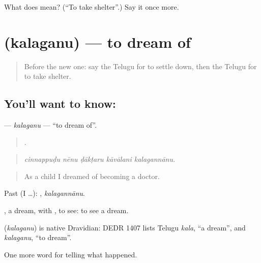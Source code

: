 \begin{tcolorbox}[breakable,colback=teal!4,colframe=teal!35!black,title={Before you move on}]
What does  mean? (\textquotedblleft{}To take shelter\textquotedblright{}.) Say it once more.
\end{tcolorbox}
\section[\texorpdfstring{\te{కలగను} (kalaganu)}{కలగను (kalaganu)}]{ (kalaganu) — to dream of}

\label{lesson:TE-C358-kalaganu}



\begin{quote}
Before the new one: say the Telugu for to settle down, then the Telugu for to take shelter.
\end{quote}

\subsection*{You'll want to know: }
\textbf{} — \emph{kalaganu} — \textquotedblleft{}to dream of\textquotedblright{}.

\begin{quote}
    .
\end{quote}

\begin{quote}
\emph{cinnappuḍu nēnu ḍākṭaru kāvālani kalagannānu.}
\end{quote}

\begin{quote}
As a child I dreamed of becoming a doctor.
\end{quote}

Past (I …): , \emph{kalagannānu}.

, a dream, with , to see: to see a dream.

\begin{cousinweb}
\textbf{} (\emph{kalaganu}) is native Dravidian: DEDR 1407 lists Telugu \emph{kala}, \textquotedblleft{}a dream\textquotedblright{}, and \emph{kalaganu}, \textquotedblleft{}to dream\textquotedblright{}.
\end{cousinweb}

\begin{grammarlens}[title={What you've built}]
One more word for telling what happened.
\end{grammarlens}

